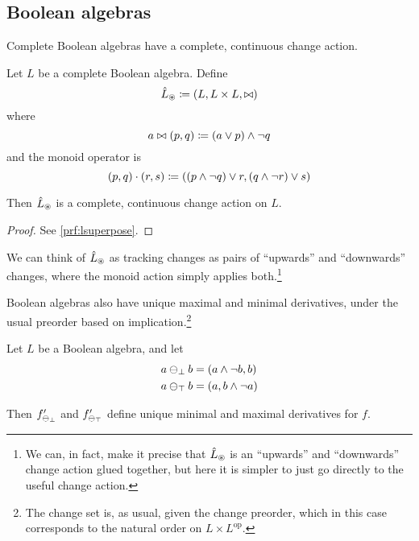 \subsection{Boolean algebras}
\label{sec:booleanAlgebras}

Complete Boolean algebras have a complete, continuous change action.

\begin{prop}[name=Boolean algebra change actions, restate=lsuperpose]
 Let $L$ be a complete Boolean algebra. Define
  \begin{displaymath}
    \hat{L}_\circledast \coloneqq (L,L \times L,\bowtie)
  \end{displaymath}
  where
  \begin{displaymath}
    a \bowtie (p, q) \coloneqq (a \vee p) \wedge \neg q
  \end{displaymath}
  and the monoid operator is
  \begin{displaymath}
    (p, q) \cdot (r, s) \coloneqq ((p \wedge \neg q) \vee r, (q \wedge \neg r) \vee s)
  \end{displaymath}

  Then $\hat{L}_\circledast$ is a complete, continuous change action on $L$.
\end{prop}
\ifproofs
\begin{proof}
  See \cref{prf:lsuperpose}.
\end{proof}
\fi

We can think of $\hat{L}_\circledast$ as tracking changes as pairs of ``upwards'' and
``downwards'' changes, where the monoid action simply applies both.\footnote{We
  can, in fact, make it precise that $\hat{L}_\circledast$ is an ``upwards''
  and ``downwards'' change action glued together, but here it is simpler to
  just go directly to the useful change action.}  

Boolean algebras also have unique maximal and minimal
derivatives, under the usual preorder based on implication.\footnote{The change
set is, as usual, given the change preorder, which in this case corresponds to
the natural order on $L \times L^{\textrm{op}}$.}

\begin{prop}
  Let $L$ be a Boolean algebra, and let
  \begin{align*}
    a \ominus_\bot b &= (a \wedge \neg b, b)\\
    a \ominus_\top b &= (a, b \wedge \neg a)
  \end{align*}

  Then $f'_{\ominus_{\bot}}$ and $f'_{\ominus_{\top}}$ 
  define unique minimal and maximal derivatives for $f$.
\end{prop}

